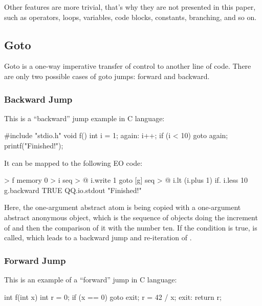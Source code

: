 \documentclass[sigplan,11pt,nonacm,natbib=false]{acmart}
\begin{document}
Other features are more trivial, that's why they are not presented in this paper, such as operators, loops, variables, code blocks, constants, branching, and so on.

\subsection{Goto}
\label{sec:goto}
 
Goto is a one-way imperative transfer of control to another line of code. There are only two possible cases of goto jumps: forward and backward. 

\subsubsection{Backward Jump}

This is a ``backward'' jump example in C language:

\begin{ffcode}
#include "stdio.h"
void f() {
  int i = 1;
  again:
  i++;
  if (i < 10) goto again;
  printf("Finished!");
}
\end{ffcode}

It can be mapped to the following EO code:

\begin{ffcode}
[] > f
  memory 0 > i
  seq > @
    i.write 1
    goto
      [g]
        seq > @
          i.lt (i.plus 1)
          if.
            i.less 10
            g.backward
            TRUE
    QQ.io.stdout "Finished!"
\end{ffcode}

Here, the one-argument abstract atom  is being copied with a one-argument abstract anonymous object, which is the sequence of objects doing the increment of  and then the comparison of it with the number ten. If the condition is true,  is called, which leads to a backward jump and re-iteration of .

\subsubsection{Forward Jump}

This is an example of a ``forward'' jump in C language:

\begin{ffcode}
int f(int x) {
  int r = 0;
  if (x == 0) goto exit;
  r = 42 / x;
  exit:
  return r;
}
\end{ffcode}
\end{document}
